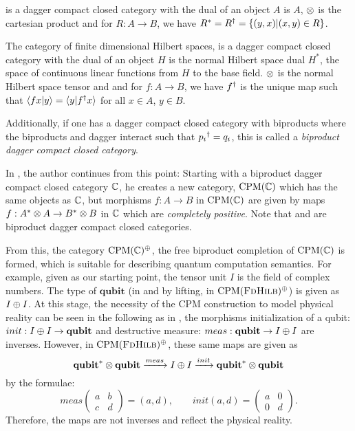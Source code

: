 \begin{example}[\rel]
  \rel is a dagger compact closed category with the dual of an object $A$ is $A$, $\otimes$ is the
  cartesian product and for $R:A\to B$, we have ${R}^{*} = {R}^{\dagger} = \{(y,x) | (x,y) \in R\}$.
\end{example}
\begin{example}[\fdh]
  The category of finite dimensional Hilbert spaces, \fdh is a dagger compact closed category with
  the dual of an object $H$ is the normal Hilbert space dual $H^{*}$, the space of continuous
  linear functions from $H$ to the base field. $\otimes$ is the normal Hilbert space tensor and and for
  $f:A\to B$, we have ${f}^{\dagger}$ is the unique map such that $\langle f x | y \rangle = \langle y |
  {f}^{\dagger}x \rangle$ for all $x\in A$, $y \in B$.
\end{example}

Additionally, if one has a dagger compact closed category with biproducts where the biproducts and
dagger interact such that ${p_i}^{\dagger} = q_i$, this is called a \emph{biproduct dagger compact closed
category}.

In \cite{selinger05:dagger}, the author continues from this point: Starting with a biproduct dagger
compact closed category $\mathbb{C}$, he creates a new category, $\text{CPM}(\mathbb{C})$ which has the same
objects as $\mathbb{C}$, but morphisms $f:A \to B$ in $\text{CPM}(\mathbb{C})$ are given by maps $f:{A}^{*} \otimes A
\to {B}^{*} \otimes B$ in $\mathbb{C}$ which are \emph{completely positive}. Note that \rel and \fdh are
biproduct dagger compact closed categories.

From this, the category $\text{CPM}(\mathbb{C})^{\oplus}$, the free biproduct completion of $\text{CPM}(\mathbb{C})$ is
formed, which is suitable for describing quantum computation semantics. For example, given \fdh as
our starting point, the tensor unit $I$ is the field of complex numbers. The type of
$\mathbf{qubit}$ (in \fdh and by lifting, in $\text{CPM}(\textsc{FdHilb})^{\oplus}$) is given as $I\oplus I$. At this
stage, the necessity of the CPM construction to model physical reality can be seen in the following
as in \fdh, the morphisms initialization of a qubit: $init:I\oplus I \to \mathbf{qubit}$ and destructive
measure: $meas: \mathbf{qubit} \to I\oplus I$ are inverses. However, in $\text{CPM}(\textsc{FdHilb})^{\oplus}$, these
same maps are given as
\[
  {\mathbf{qubit}}^{*} \otimes \mathbf{qubit} \xrightarrow{meas} I\oplus
    I \xrightarrow{init}{\mathbf{qubit}}^{*} \otimes \mathbf{qubit}
\]
by the formulae:
\[
  meas
  \begin{pmatrix}
    a & b \\
    c & d
  \end{pmatrix}
  = (a,d), \qquad init(a,d) =
  \begin{pmatrix}
    a &0 \\
    0 & d
  \end{pmatrix}.
\]
Therefore, the maps are not inverses and reflect the physical reality.


